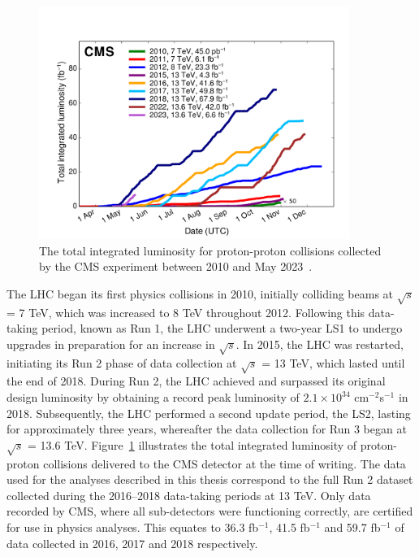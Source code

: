 \begin{figure}[h]
    \centering
    \includegraphics[width=0.9\textwidth]{Figures/int_lumi_cumulative_pp_2.pdf}
    \caption{The total integrated luminosity for proton-proton collisions collected by the \ac{CMS} experiment between 2010 and May 2023~\cite{lumi}.}
    \label{fig:int_lumi}
\end{figure}

The \ac{LHC} began its first physics collisions in 2010, initially colliding beams at $\sqrt{s}$ = 7 TeV, which was increased to 8 TeV throughout 2012. 
Following this data-taking period, known as Run 1, the \ac{LHC} underwent a two-year \ac{LS1} to undergo upgrades in preparation for an increase in $\sqrt{s}$. 
In 2015, the \ac{LHC} was restarted, initiating its Run 2 phase of data collection at $\sqrt{s}$ = 13 TeV, which lasted until the end of 2018. 
During Run 2, the \ac{LHC} achieved and surpassed its original design luminosity by obtaining a record peak luminosity of $2.1\times10^{34}$ cm$^{−2}$s$^{−1}$ in 2018.
Subsequently, the \ac{LHC} performed a second update period, the \ac{LS2}, lasting for approximately three years, whereafter the data collection for Run 3 began at $\sqrt{s}$ = 13.6 TeV.
Figure~\ref{fig:int_lumi} illustrates the total integrated luminosity of proton-proton collisions delivered to the \ac{CMS} detector at the time of writing.
The data used for the analyses described in this thesis correspond to the full Run 2 dataset collected during the 2016--2018 data-taking periods at 13 TeV. 
Only data recorded by \ac{CMS}, where all sub-detectors were functioning correctly, are certified for use in physics analyses. 
This equates to 36.3 fb$^{−1}$, 41.5 fb$^{−1}$ and 59.7 fb$^{-1}$ of data collected in 2016, 2017 and 2018 respectively. \\

